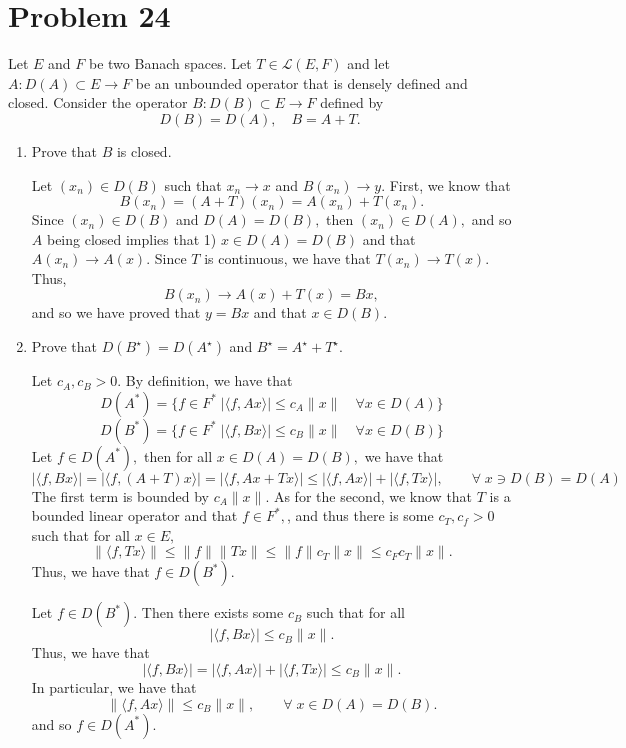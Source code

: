 \documentclass[11pt]{article}
\begin{document}
\section*{Problem 24}
\begin{problem}
    Let \( E \) and \( F \) be two Banach spaces. Let \( T \in \mathcal{L}(E, F) \) and let \( A : D(A) \subset E \to F \) be an unbounded operator that is densely defined and closed. Consider the operator \( B : D(B) \subset E \to F \) defined by  
\[
D(B) = D(A), \quad B = A + T.
\]

\begin{enumerate}
    \item Prove that \( B \) is closed.
\begin{solution}
Let $(x_n) \in D(B)$ such that $x_n \to x$ and $B(x_n) \to y.$ First, we know that 
\[B(x_n) = (A + T)(x_n) = A(x_n)+ T(x_n).\] Since $(x_n) \in D(B)$ and $D(A)= D(B),$ then $(x_n)\in D(A),$ and so  $A$ being closed implies that 1) $x\in D(A) = D(B)$ and that $A(x_n) \to A(x).$ Since $T$ is continuous, we have that $T(x_n) \to T(x).$ Thus, 
\[B(x_n) \to A(x) + T(x) = Bx,\] and so we have proved that $y = Bx$ and that $x\in D(B).$
\end{solution}

    \item Prove that \( D(B^\star) = D(A^\star) \) and \( B^\star = A^\star + T^\star \).\begin{solution}
    
Let $c_A, c_B>0.$
By definition, we have that 
\[D(A^*) = \{f\in F^* \; |\langle f, Ax \rangle| \leq c_A\|x\| \quad \forall x\in D(A)\}\]
\[D(B^*) = \{f\in F^* \; |\langle f, Bx \rangle| \leq c_B\|x\| \quad \forall x\in D(B)\}\]
Let $f\in D(A^*),$ then for all $x\in D(A) = D(B),$ we have that 
\[|\langle f, Bx \rangle|  = |\langle f, (A + T)x \rangle| = |\langle f, Ax + Tx \rangle| \leq |\langle f, Ax \rangle| + |\langle f, Tx \rangle |, \qquad \forall \; x\ni D(B) = D(A)\] The first term is bounded by $c_A\|x\|.$ As for the second, we know that $T$ is a bounded linear operator and that $f \in F^*,$, and thus there is some $c_T, c_f >0$ such that for all $x\in E,$ 
\[\|\langle f, Tx\rangle\| \leq \|f\|\|Tx\| \leq \|f\|c_T\|x\| \leq c_Fc_T\|x\|.\] Thus, we have that $f\in D(B^*).$ 

Let $f\in D(B^*).$ Then there exists some $c_B$ such that for all  
\[|\langle f ,  Bx\rangle| \leq c_B \|x\|.\] Thus, we have that 
\[|\langle f ,  Bx\rangle| = |\langle f ,  Ax\rangle| + |\langle f, Tx\rangle| \leq c_B \|x\|.\] In particular, we have that 
\[\|\langle f, Ax\rangle \| \leq c_B\|x\|, \qquad \forall \; x \in D(A) = D(B).\] and so $f\in D(A^*).$


\end{solution}
\end{enumerate}
\end{problem}
\end{document}
